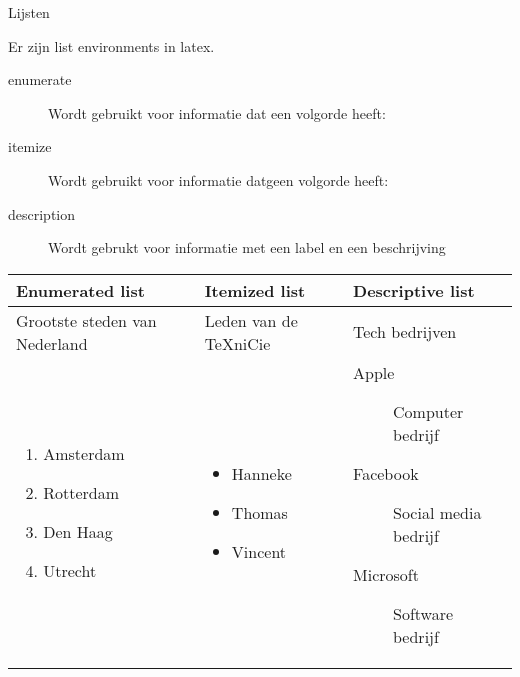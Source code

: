 \begin{frame}[fragile]{Lijsten}

Er zijn list environments in latex.


\begin{description}
	\item[enumerate]  Wordt gebruikt voor informatie dat een volgorde heeft:
	\item[itemize] Wordt gebruikt voor informatie datgeen volgorde heeft:
	\item[description] Wordt gebrukt voor informatie met een label en een beschrijving
\end{description}
	\begin{tcolorbox}[width=13cm, title={Voorbeelden}, size=small]
	\begin{tabular}{m{3cm}| m{3cm} | m{5cm}}
		\textbf{Enumerated list} & \textbf{Itemized list} & \textbf{Descriptive list}\\
		\hline
		Grootste steden van Nederland &Leden van de TeXniCie &   Tech bedrijven\\
		\hline
		\begin{enumerate}[label=\arabic*)]
			\item Amsterdam 
			\item Rotterdam
			\item Den Haag
			\item Utrecht
		\end{enumerate}
		&
		\begin{itemize}[label=\textbullet]
			\item Hanneke 
			\item Thomas
			\item Vincent
		\end{itemize}
		& 
		\begin{description}
		\item[Apple] Computer bedrijf
		\item[Facebook] Social media bedrijf
		\item[Microsoft] Software bedrijf
		\end{description}
	\end{tabular}
	\end{tcolorbox}
\end{frame}
